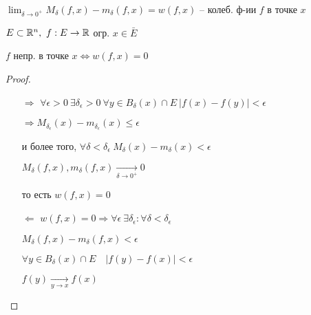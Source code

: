     \begin{definition}
        $\lim_{\delta \rightarrow 0^+} M_\delta(f, x) - m_\delta(f, x) = w(f, x)$ -- колеб. ф-ии $f$ в точке $x$
    \end{definition}

    \begin{lemma}
        $E \subset \mathbb{R}^n, \ f : E \rightarrow \mathbb{R}$ огр. \quad $x \in \bar E$
        \par $f$ непр. в точке $x \Leftrightarrow w(f, x) = 0$
    \end{lemma}
    \begin{proof}
        $ $
        \begin{enumerate}
            \item[$\boxed \Rightarrow$] $\forall \epsilon > 0 \ \exists \delta_\epsilon > 0 \ \forall y \in B_\delta(x) \cap E \ |f(x) - f(y)| < \epsilon$
                \par $\Rightarrow M_{\delta_\epsilon}(x) - m_{\delta_\epsilon}(x) \le \epsilon$
                \par и более того, $\forall \delta < \delta_\epsilon \ M_{\delta}(x) - m_{\delta}(x) < \epsilon$ %
                \par $M_\delta(f, x) , m_\delta(f, x) \xrightarrow[\delta \rightarrow 0^+]{} 0$
                \par то есть $w(f, x) = 0$
            \item[$\boxed \Leftarrow$] $w(f, x) = 0 \Rightarrow \forall \epsilon \ \exists \delta_\epsilon : \forall \delta < \delta_\epsilon$
                \par $M_\delta(f, x) - m_\delta(f, x) < \epsilon$
                \par $\forall y \in B_\delta(x) \cap E \quad |f(y) - f(x)| < \epsilon$
                \par $f(y) \xrightarrow[y \rightarrow x]{} f(x)$
        \end{enumerate}
    \end{proof}

